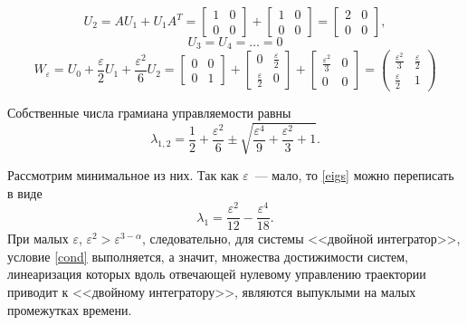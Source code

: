 \documentclass[../main.tex]{subfiles}
\begin{document}
 \begin{equation*}
	 U_2 = A U_1 + U_1 A^T = \left[ {\begin{array}{*{20}{c}}
			 1&0\\
			 0&0
	 \end{array}}\right] + \left[ {\begin{array}{*{20}{c}}
			 1&0\\
			 0&0
	 \end{array}}\right] = \left[ {\begin{array}{*{20}{c}}
			 2&0\\
			 0&0
	 \end{array}}\right],
 \end{equation*}
 \begin{equation*}
	 U_3 = U_4 = \dots = 0
 \end{equation*}
 \begin{equation*}
	 W_{\varepsilon} = U_0 + \dfrac{\varepsilon}{2} U_1 + \dfrac{\varepsilon^2}{6} U_2 = \left[ {\begin{array}{*{20}{c}}
			 0&0\\
			 0&1
	 \end{array}}\right] + \left[ {\begin{array}{*{20}{c}}
			 0&\frac{\varepsilon}{2}\\
			 \frac{\varepsilon}{2}&0
	 \end{array}}\right] +\left[ {\begin{array}{*{20}{c}}
			 \frac{\varepsilon^2}{3}&0\\
			 0&0
	 \end{array}}\right] =  
	 \begin{pmatrix}
		 \frac{\varepsilon^2}{3}&\frac{\varepsilon}{2}\\
		 \frac{\varepsilon}{2}&1
	 \end{pmatrix} 
 \end{equation*}
 
 Собственные числа грамиана управляемости равны
 \begin{equation}\label{eigs}
	 \lambda_{1,2} = \dfrac{1}{2}+\dfrac{\varepsilon^2}{6} \pm \sqrt{\dfrac{\varepsilon^4}{9} + \dfrac{\varepsilon^2}{3} +1}.
 \end{equation}
 
 Рассмотрим минимальное из них. Так как $ \varepsilon $~--- мало, то \eqref{eigs} можно переписать в виде
 \begin{equation*}
	 \lambda_1 = \dfrac{\varepsilon^2}{12} - \dfrac{\varepsilon^4}{18}.
 \end{equation*} 
 При малых $ \varepsilon  $, $ \varepsilon^2 >  \varepsilon^{3-\alpha}  $, следовательно,  для системы <<двойной интегратор>>, условие \eqref{cond} выполняется, а значит, множества достижимости систем, линеаризация которых вдоль отвечающей нулевому управлению траектории приводит к <<двойному интегратору>>, являются выпуклыми на малых промежутках времени.
\end{document}

